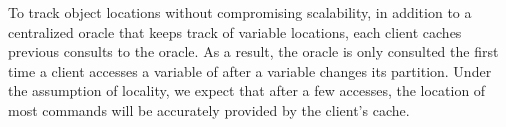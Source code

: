 To track object locations without compromising scalability, in addition to a centralized oracle that keeps track of variable locations, each client caches previous consults to the oracle.
As a result, the oracle is only consulted the first time a client accesses a variable of after a variable changes its partition.
Under the assumption of locality, we expect that after a few accesses, the location of most commands will be accurately provided by the client's cache.









